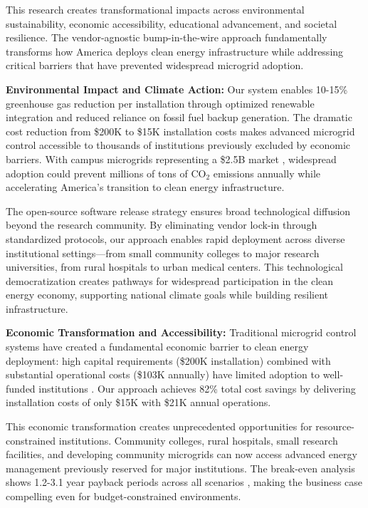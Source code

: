 \documentclass[12pt]{article}
\begin{document}
This research creates transformational impacts across environmental sustainability, economic accessibility, educational advancement, and societal resilience. The vendor-agnostic bump-in-the-wire approach fundamentally transforms how America deploys clean energy infrastructure while addressing critical barriers that have prevented widespread microgrid adoption.

\textbf{Environmental Impact and Climate Action:} Our system enables 10-15\% greenhouse gas reduction per installation through optimized renewable integration and reduced reliance on fossil fuel backup generation. The dramatic cost reduction from \$200K to \$15K installation costs \cite{our2024economic} makes advanced microgrid control accessible to thousands of institutions previously excluded by economic barriers. With campus microgrids representing a \$2.5B market \cite{our2024economic}, widespread adoption could prevent millions of tons of CO$_2$ emissions annually while accelerating America's transition to clean energy infrastructure.

The open-source software release strategy ensures broad technological diffusion beyond the research community. By eliminating vendor lock-in through standardized protocols, our approach enables rapid deployment across diverse institutional settings—from small community colleges to major research universities, from rural hospitals to urban medical centers. This technological democratization creates pathways for widespread participation in the clean energy economy, supporting national climate goals while building resilient infrastructure.

\textbf{Economic Transformation and Accessibility:} Traditional microgrid control systems have created a fundamental economic barrier to clean energy deployment: high capital requirements (\$200K installation) combined with substantial operational costs (\$103K annually) have limited adoption to well-funded institutions \cite{hirsch2018,sigrin2019}. Our approach achieves 82\% total cost savings \cite{our2024economic} by delivering installation costs of only \$15K with \$21K annual operations.

This economic transformation creates unprecedented opportunities for resource-constrained institutions. Community colleges, rural hospitals, small research facilities, and developing community microgrids can now access advanced energy management previously reserved for major institutions. The break-even analysis shows 1.2-3.1 year payback periods across all scenarios \cite{our2024economic}, making the business case compelling even for budget-constrained environments.
\end{document}
